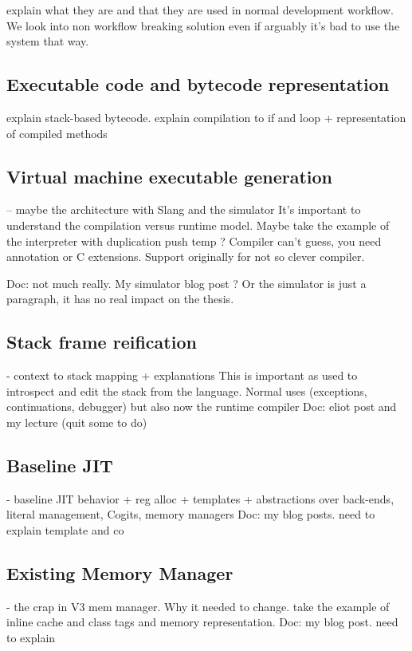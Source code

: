 \documentclass[a4paper,12pt,twoside]{../includes/ThesisStyle}
\begin{document}
explain what they are and that they are used in normal development workflow. We look into non workflow breaking solution even if arguably it's bad to use the system that way.

\subsection{Executable code and bytecode representation}

explain stack-based bytecode.
explain compilation to if and loop
+ representation of compiled methods 

\subsection{Virtual machine executable generation}
-- maybe the architecture with Slang and the simulator
It's important to understand the compilation versus runtime model.
Maybe take the example of the interpreter with duplication push temp ? Compiler can't guess, you need annotation or C extensions. Support originally for not so clever compiler.

Doc: not much really. My simulator blog post ?
Or the simulator is just a paragraph, it has no real impact on the thesis.

\subsection{Stack frame reification}
- context to stack mapping + explanations
This is important as used to introspect and edit the stack from the language. Normal uses (exceptions, continuations, debugger) but also now the runtime compiler
Doc: eliot post and my lecture (quit some to do)

\subsection{Baseline JIT}
- baseline JIT behavior + reg alloc + templates + abstractions over back-ends, literal management, Cogits, memory managers
Doc: my blog posts. need to explain template and co

\subsection{Existing Memory Manager}
- the crap in V3 mem manager. Why it needed to change.
take the example of inline cache and class tags and memory representation.
Doc: my blog post. need to explain

\ifx\wholebook\relax\else
    
\end{document}
